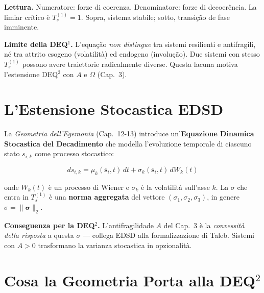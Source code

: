 \Proved{} \textbf{Lettura.} Numeratore: forze di coerenza. Denominatore:
forze di decoerência. La limiar crítico è \(T_s^{(1)} = 1\). Sopra,
sistema stabile; sotto, transição de fase imminente.

\Conj{} \textbf{Limite della DEQ$^1$.} L'equação \emph{non distingue} tra
sistemi resilienti e antifragili, né tra attrito esogeno (volatilità) ed
endogeno (involução). Due sistemi con stesso \(T_s^{(1)}\) possono
avere traiettorie radicalmente diverse. Questa lacuna motiva
l'estensione DEQ$^2$ con \(A\) e \(\Omega\) (Cap.~3).



\section{L'Estensione Stocastica
EDSD}\label{lestensione-stocastica-edsd}

La \emph{Geometria dell'Egemonia} (Cap.~12-13) introduce
un'\textbf{Equazione Dinamica Stocastica del Decadimento} che modella
l'evoluzione temporale di ciascuno stato \(s_{i,k}\) come processo
stocastico:

\[
ds_{i,k} = \mu_k(\mathbf{s}_i, t)\, dt + \sigma_k(\mathbf{s}_i, t)\, dW_k(t)
\]

onde \(W_k(t)\) è un processo di Wiener e \(\sigma_k\) è la volatilità
sull'asse \(k\). La \(\sigma\) che entra in \(T_s^{(1)}\) è una
\textbf{norma aggregata} del vettore \((\sigma_1, \sigma_2, \sigma_3)\),
in genere \(\sigma = \|\boldsymbol{\sigma}\|_2\).

\Hypoth{} \textbf{Conseguenza per la DEQ$^2$.} L'antifragilidade \(A\) del
Cap.~3 è la \emph{convessità della risposta} a questa \(\sigma\) ---
collega EDSD alla formalizzazione di Taleb. Sistemi con \(A > 0\)
trasformano la varianza stocastica in opzionalità.



\section{Cosa la Geometria Porta alla
DEQ$^2$}\label{cosa-la-geometria-porta-alla-dequxb2}

